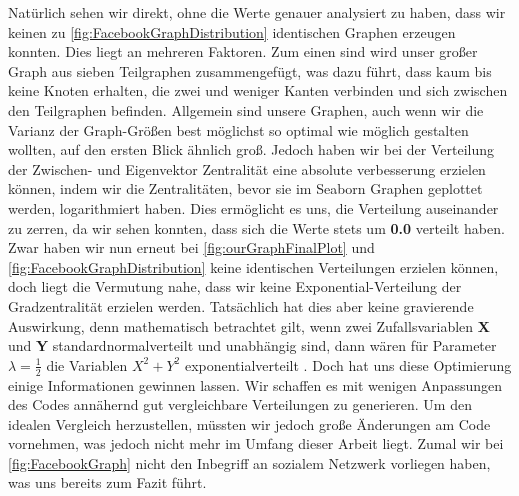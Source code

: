 Natürlich sehen wir direkt, ohne die Werte genauer analysiert zu haben, dass wir keinen zu \ref{fig:FacebookGraphDistribution} identischen Graphen erzeugen konnten. Dies liegt an mehreren Faktoren. Zum einen sind wird unser großer Graph aus sieben Teilgraphen zusammengefügt, was dazu führt, dass kaum bis keine Knoten erhalten, die zwei und weniger Kanten verbinden und sich zwischen den Teilgraphen befinden. Allgemein sind unsere Graphen, auch wenn wir die Varianz der Graph-Größen best möglichst so optimal wie möglich gestalten wollten, auf den ersten Blick ähnlich groß. Jedoch haben wir bei der Verteilung der Zwischen- und Eigenvektor Zentralität eine absolute verbesserung erzielen können, indem wir die Zentralitäten, bevor sie im Seaborn Graphen geplottet werden, logarithmiert haben. Dies ermöglicht es uns, die Verteilung auseinander zu zerren, da wir sehen konnten, dass sich die Werte stets um \textbf{0.0} verteilt haben. Zwar haben wir nun erneut bei \ref{fig:ourGraphFinalPlot} und \ref{fig:FacebookGraphDistribution} keine identischen Verteilungen erzielen können, doch liegt die Vermutung nahe, dass wir keine Exponential-Verteilung der Gradzentralität erzielen werden. Tatsächlich hat dies aber keine gravierende Auswirkung, denn mathematisch betrachtet gilt, wenn zwei Zufallsvariablen \textbf{X} und \textbf{Y} standardnormalverteilt und unabhängig sind, dann wären für Parameter $\lambda = \frac{1}{2}$ die Variablen $X^2+Y^2$ exponentialverteilt \cite{verteilung}. Doch hat uns diese Optimierung einige Informationen gewinnen lassen. Wir schaffen es mit wenigen Anpassungen des Codes annähernd gut vergleichbare Verteilungen zu generieren. Um den idealen Vergleich herzustellen, müssten wir jedoch große Änderungen am Code vornehmen, was jedoch nicht mehr im Umfang dieser Arbeit liegt. Zumal wir bei \ref{fig:FacebookGraph} nicht den Inbegriff an sozialem Netzwerk vorliegen haben, was uns bereits zum Fazit führt.  



